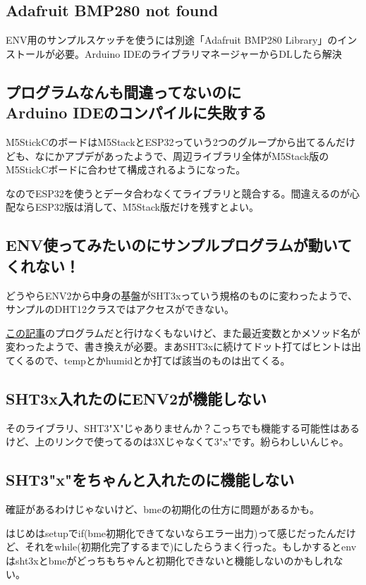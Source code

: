 \documentclass[fleqn,twocolumn]{mynote}
\begin{document}
  \subsection*{Adafruit BMP280 not found}
  ENV用のサンプルスケッチを使うには別途「Adafruit BMP280 Library」のインストールが必要。Arduino
  IDEのライブラリマネージャーからDLしたら解決

  \subsection*{プログラムなんも間違ってないのに\\Arduino IDEのコンパイルに失敗する}
  M5StickCのボードはM5StackとESP32っていう2つのグループから出てるんだけども、なにかアプデがあったようで、周辺ライブラリ全体がM5Stack版のM5StickCボードに合わせて構成されるようになった。

  なのでESP32を使うとデータ合わなくてライブラリと競合する。間違えるのが心配ならESP32版は消して、M5Stack版だけを残すとよい。

  \subsection*{ENV使ってみたいのにサンプルプログラムが動いてくれない！}
  どうやらENV2から中身の基盤がSHT3xっていう規格のものに変わったようで、サンプルのDHT12クラスではアクセスができない。

  \href{https://qiita.com/visyeii/items/e28f8500f43166710664}{この記事}のプログラムだと行けなくもないけど、また最近変数とかメソッド名が変わったようで、書き換えが必要。まあSHT3xに続けてドット打てばヒントは出てくるので、tempとかhumidとか打てば該当のものは出てくる。

  \subsection*{SHT3x入れたのにENV2が機能しない}
  そのライブラリ、SHT3"X"じゃありませんか？こっちでも機能する可能性はあるけど、上のリンクで使ってるのは3Xじゃなくて3"x"です。紛らわしいんじゃ。

  \subsection*{SHT3"x"をちゃんと入れたのに機能しない}
  確証があるわけじゃないけど、bmeの初期化の仕方に問題があるかも。

  はじめはsetupでif(bme初期化できてないならエラー出力)って感じだったんだけど、それをwhile(初期化完了するまで)にしたらうまく行った。もしかするとenvはsht3xとbmeがどっちもちゃんと初期化できないと機能しないのかもしれない。

  
  
  
\end{document}

